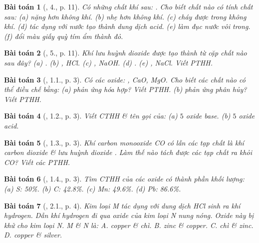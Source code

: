 \documentclass{article}
\newtheorem{baitoan}{Bài toán}
\begin{document}
\begin{baitoan}[\cite{SGK_Hoa_Hoc_9}, 4., p. 11]
	Có những chất khí sau: \emph{}. Cho biết chất nào có tính chất sau: (a) nặng hơn không khí. (b) nhẹ hơn không khí. (c) cháy được trong không khí. (d) tác dụng với nước tạo thành dung dịch acid. (e) làm đục nước vôi trong. (f) đổi màu giấy quỳ tím ẩm thành đỏ.
\end{baitoan}

\begin{baitoan}[\cite{SGK_Hoa_Hoc_9}, 5., p. 11]
	Khí lưu huỳnh dioxide được tạo thành từ cặp chất nào sau đây? (a) \emph{}. (b) \emph{, HCl}. (c) \emph{, NaOH}. (d) \emph{}. (e) \emph{, NaCl}. Viết PTHH.
\end{baitoan}

\begin{baitoan}[\cite{SBT_Hoa_Hoc_9}, 1.1., p. 3]
	Có các oxide: \emph{, CaO, MgO}. Cho biết các chất nào có thể điều chế bằng: (a) phản ứng hóa hợp? Viết PTHH. (b) phản ứng phân hủy? Viết PTHH.
\end{baitoan}

\begin{baitoan}[\cite{SBT_Hoa_Hoc_9}, 1.2., p. 3]
	Viết CTHH \& tên gọi của: (a) $5$ oxide base. (b) $5$ oxide acid.
\end{baitoan}

\begin{baitoan}[\cite{SBT_Hoa_Hoc_9}, 1.3., p. 3]
	Khí carbon monooxide \emph{CO} có lẫn các tạp chất là khí carbon dioxide \emph{} \& lưu huỳnh dioxide \emph{}. Làm thế nào tách được các tạp chất ra khỏi \emph{CO}? Viết các PTHH.
\end{baitoan}

\begin{baitoan}[\cite{SBT_Hoa_Hoc_9}, 1.4., p. 3]
	Tìm CTHH của các oxide có thành phần khối lượng: (a) \emph{S: 50\%}. (b) \emph{C: 42.8\%}. (c) \emph{Mn: 49.6\%}. (d) \emph{Pb: 86.6\%}.
\end{baitoan}

\begin{baitoan}[\cite{SBT_Hoa_Hoc_9}, 2.1., p. 4]
	Kim loại M tác dụng với dung dịch \emph{HCl} sinh ra khí hydrogen. Dẫn khí hydrogen đi qua oxide của kim loại N nung nóng. Oxide này bị khử cho kim loại N. M \& N là: {\sf A.} copper \& chì. {\sf B.} zinc \& copper. {\sf C.} chì \& zinc. {\sf D.} copper \& silver.
\end{baitoan}
\end{document}
